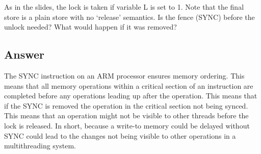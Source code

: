 \documentclass{article}
\begin{document}
As in the slides, the lock is taken if variable L is set to 1. Note that the final store is a plain store with no ‘release’ semantics. Is the fence (SYNC) before the unlock needed? What would happen if it was removed?

\subsection*{Answer}

The SYNC instruction on an ARM processor ensures memory ordering. This means that all memory operations within a critical section of an instruction are completed before any operations leading up after the operation. This means that if the SYNC is removed the operation in the critical section not being synced. This means that an operation might not be visible to other threads before the lock is released. In short, because a write-to memory could be delayed without SYNC could lead to the changes not being visible to other operations in a multithreading system.


\newpage
\printbibliography
\end{document}
